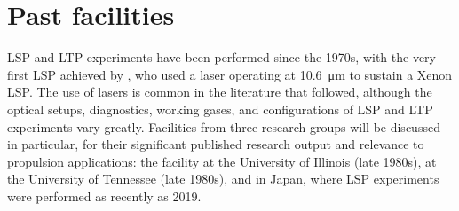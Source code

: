     \section{Past facilities} \label{sec:background_exp}
        LSP and LTP experiments have been performed since the 1970s, with the very first LSP achieved by \textcite{generalovContinuousOpticalDischarge1970}, who used a  laser operating at \qty{10.6}{\um} to sustain a Xenon LSP. The use of  lasers is common in the literature that followed, although the optical setups, diagnostics, working gases, and configurations of LSP and LTP experiments vary greatly. Facilities from three research groups will be discussed in particular, for their significant published research output and relevance to propulsion applications: the facility at the University of Illinois (late 1980s), at the University of Tennessee (late 1980s), and in Japan, where LSP experiments were performed as recently as 2019. 


